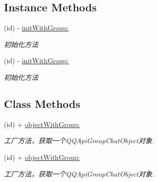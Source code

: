 \subsection*{Instance Methods}
\begin{DoxyCompactItemize}
\item 
\mbox{\label{interface_q_q_api_group_chat_object_a0f0db3988ff93a6addc38d8076cdb743}} 
(id) -\/ \mbox{\hyperlink{interface_q_q_api_group_chat_object_a0f0db3988ff93a6addc38d8076cdb743}{init\+With\+Group\+:}}
\begin{DoxyCompactList}\small\item\em 初始化方法 \end{DoxyCompactList}\item 
\mbox{\label{interface_q_q_api_group_chat_object_a0f0db3988ff93a6addc38d8076cdb743}} 
(id) -\/ \mbox{\hyperlink{interface_q_q_api_group_chat_object_a0f0db3988ff93a6addc38d8076cdb743}{init\+With\+Group\+:}}
\begin{DoxyCompactList}\small\item\em 初始化方法 \end{DoxyCompactList}\end{DoxyCompactItemize}
\subsection*{Class Methods}
\begin{DoxyCompactItemize}
\item 
\mbox{\label{interface_q_q_api_group_chat_object_a9d2264403b61885fa03e0883f9505486}} 
(id) + \mbox{\hyperlink{interface_q_q_api_group_chat_object_a9d2264403b61885fa03e0883f9505486}{object\+With\+Group\+:}}
\begin{DoxyCompactList}\small\item\em 工厂方法，获取一个\+Q\+Q\+Api\+Group\+Chat\+Object对象. \end{DoxyCompactList}\item 
\mbox{\label{interface_q_q_api_group_chat_object_a9d2264403b61885fa03e0883f9505486}} 
(id) + \mbox{\hyperlink{interface_q_q_api_group_chat_object_a9d2264403b61885fa03e0883f9505486}{object\+With\+Group\+:}}
\begin{DoxyCompactList}\small\item\em 工厂方法，获取一个\+Q\+Q\+Api\+Group\+Chat\+Object对象. \end{DoxyCompactList}\end{DoxyCompactItemize}
